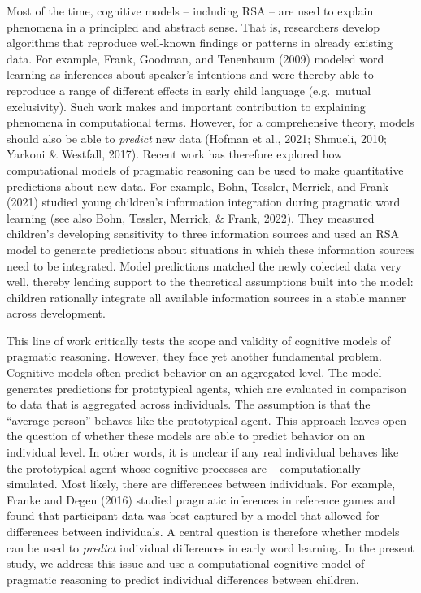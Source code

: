 \documentclass[
  man,floatsintext]{apa6}
\begin{document}
Most of the time, cognitive models -- including RSA -- are used to explain phenomena in a principled and abstract sense. That is, researchers develop algorithms that reproduce well-known findings or patterns in already existing data. For example, Frank, Goodman, and Tenenbaum (2009) modeled word learning as inferences about speaker's intentions and were thereby able to reproduce a range of different effects in early child language (e.g.~mutual exclusivity). Such work makes and important contribution to explaining phenomena in computational terms. However, for a comprehensive theory, models should also be able to \emph{predict} new data (Hofman et al., 2021; Shmueli, 2010; Yarkoni \& Westfall, 2017). Recent work has therefore explored how computational models of pragmatic reasoning can be used to make quantitative predictions about new data. For example, Bohn, Tessler, Merrick, and Frank (2021) studied young children's information integration during pragmatic word learning (see also Bohn, Tessler, Merrick, \& Frank, 2022). They measured children's developing sensitivity to three information sources and used an RSA model to generate predictions about situations in which these information sources need to be integrated. Model predictions matched the newly colected data very well, thereby lending support to the theoretical assumptions built into the model: children rationally integrate all available information sources in a stable manner across development.

This line of work critically tests the scope and validity of cognitive models of pragmatic reasoning. However, they face yet another fundamental problem. Cognitive models often predict behavior on an aggregated level. The model generates predictions for prototypical agents, which are evaluated in comparison to data that is aggregated across individuals. The assumption is that the ``average person'' behaves like the prototypical agent. This approach leaves open the question of whether these models are able to predict behavior on an individual level. In other words, it is unclear if any real individual behaves like the prototypical agent whose cognitive processes are -- computationally -- simulated. Most likely, there are differences between individuals. For example, Franke and Degen (2016) studied pragmatic inferences in reference games and found that participant data was best captured by a model that allowed for differences between individuals. A central question is therefore whether models can be used to \emph{predict} individual differences in early word learning. In the present study, we address this issue and use a computational cognitive model of pragmatic reasoning to predict individual differences between children.
\end{document}
